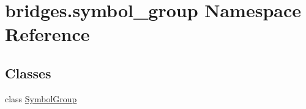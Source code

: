 \hypertarget{namespacebridges_1_1symbol__group}{}\section{bridges.\+symbol\+\_\+group Namespace Reference}
\label{namespacebridges_1_1symbol__group}
\subsection*{Classes}
\begin{DoxyCompactItemize}
\item 
class \hyperlink{classbridges_1_1symbol__group_1_1_symbol_group}{Symbol\+Group}
\end{DoxyCompactItemize}
